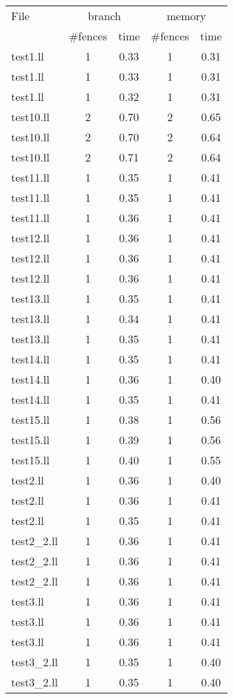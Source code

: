 \begin{tabular}{l|c|c|c|c|}
\toprule
File & \multicolumn{2}{c|}{branch} & \multicolumn{2}{c|}{memory} \\
& \#fences & time & \#fences & time\\
\midrule
test1.ll & 1 & 0.33 & 1 & 0.31\\
test1.ll & 1 & 0.33 & 1 & 0.31\\
test1.ll & 1 & 0.32 & 1 & 0.31\\
test10.ll & 2 & 0.70 & 2 & 0.65\\
test10.ll & 2 & 0.70 & 2 & 0.64\\
test10.ll & 2 & 0.71 & 2 & 0.64\\
test11.ll & 1 & 0.35 & 1 & 0.41\\
test11.ll & 1 & 0.35 & 1 & 0.41\\
test11.ll & 1 & 0.36 & 1 & 0.41\\
test12.ll & 1 & 0.36 & 1 & 0.41\\
test12.ll & 1 & 0.36 & 1 & 0.41\\
test12.ll & 1 & 0.36 & 1 & 0.41\\
test13.ll & 1 & 0.35 & 1 & 0.41\\
test13.ll & 1 & 0.34 & 1 & 0.41\\
test13.ll & 1 & 0.35 & 1 & 0.41\\
test14.ll & 1 & 0.35 & 1 & 0.41\\
test14.ll & 1 & 0.36 & 1 & 0.40\\
test14.ll & 1 & 0.35 & 1 & 0.41\\
test15.ll & 1 & 0.38 & 1 & 0.56\\
test15.ll & 1 & 0.39 & 1 & 0.56\\
test15.ll & 1 & 0.40 & 1 & 0.55\\
test2.ll & 1 & 0.36 & 1 & 0.40\\
test2.ll & 1 & 0.36 & 1 & 0.41\\
test2.ll & 1 & 0.35 & 1 & 0.41\\
test2\_2.ll & 1 & 0.36 & 1 & 0.41\\
test2\_2.ll & 1 & 0.36 & 1 & 0.41\\
test2\_2.ll & 1 & 0.36 & 1 & 0.41\\
test3.ll & 1 & 0.36 & 1 & 0.41\\
test3.ll & 1 & 0.36 & 1 & 0.41\\
test3.ll & 1 & 0.36 & 1 & 0.41\\
test3\_2.ll & 1 & 0.35 & 1 & 0.40\\
test3\_2.ll & 1 & 0.35 & 1 & 0.40\\

\end{tabular}
